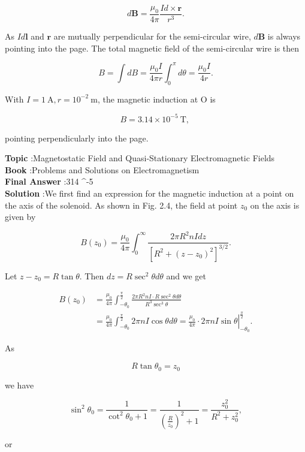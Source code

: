 \documentclass[10pt]{article}
\begin{document}
$$
d \mathbf{B}=\frac{\mu_{0}}{4 \pi} \frac{I d \times \mathbf{r}}{r^{3}} .
$$

As $I d \mathbf{l}$ and $\mathbf{r}$ are mutually perpendicular for the semi-circular wire, $d \mathbf{B}$ is always pointing into the page. The total magnetic field of the semi-circular wire is then

$$
B=\int d B=\frac{\mu_{0} I}{4 \pi r} \int_{0}^{\pi} d \theta=\frac{\mu_{0} I}{4 r} .
$$

With $I=1 \mathrm{~A}, r=10^{-2} \mathrm{~m}$, the magnetic induction at $\mathrm{O}$ is

$$
B=3.14 \times 10^{-5} \mathrm{~T} \text {, }
$$

pointing perpendicularly into the page.

\textbf{Topic} :Magnetostatic Field and Quasi-Stationary Electromagnetic Fields\\
\textbf{Book} :Problems and Solutions on Electromagnetism\\
\textbf{Final Answer} :314 ^{-5}  \text { }\\


\textbf{Solution} :We first find an expression for the magnetic induction at a point on the axis of the solenoid. As shown in Fig. 2.4, the field at point $z_{0}$ on the axis is given by

$$
B\left(z_{0}\right)=\frac{\mu_{0}}{4 \pi} \int_{0}^{\infty} \frac{2 \pi R^{2} n I d z}{\left[R^{2}+\left(z-z_{0}\right)^{2}\right]^{3 / 2}} .
$$

Let $z-z_{0}=R \tan \theta$. Then $d z=R \sec ^{2} \theta d \theta$ and we get

$$
\begin{aligned}
B\left(z_{0}\right) &=\frac{\mu_{0}}{4 \pi} \int_{-\theta_{0}}^{\frac{\pi}{2}} \frac{2 \pi R^{2} n I \cdot R \sec ^{2} \theta d \theta}{R^{3} \sec ^{3} \theta} \\
&=\frac{\mu_{0}}{4 \pi} \int_{-\theta_{0}}^{\frac{\pi}{2}} 2 \pi n I \cos \theta d \theta=\left.\frac{\mu_{0}}{4 \pi} \cdot 2 \pi n I \sin \theta\right|_{-\theta_{0}} ^{\frac{\pi}{2}} .
\end{aligned}
$$

As

$$
R \tan \theta_{0}=z_{0}
$$

we have

$$
\sin ^{2} \theta_{0}=\frac{1}{\cot ^{2} \theta_{0}+1}=\frac{1}{\left(\frac{R}{z_{0}}\right)^{2}+1}=\frac{z_{0}^{2}}{R^{2}+z_{0}^{2}},
$$

or
\end{document}

